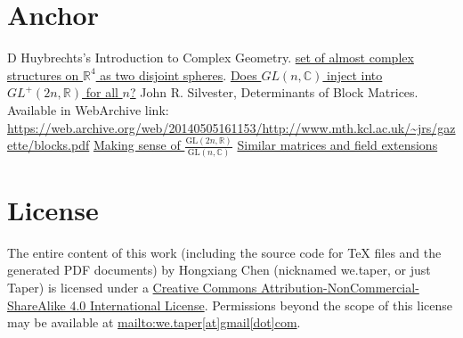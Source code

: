 \documentclass{article}
\numberwithin{equation}{subsection} %
\theoremstyle{definition}
\begin{document}
\section{Anchor}
\label{sec:Anchor}

\begin{thebibliography}{1}
   D Huybrechts's Introduction to Complex Geometry.
   \href{http://math.stackexchange.com/questions/923957/set-of-almost-complex-structures-on-mathbb-r4-as-two-disjoint-spheres}{set of almost complex structures on $\mathbb{R}^4$ as two disjoint spheres}.
   \href{http://math.stackexchange.com/questions/1356823/does-gln-mathbbc-inject-into-gl2n-mathbbr-for-all-n}{Does $GL(n,\mathbb{C})$ inject into $GL^+(2n, \mathbb{R})$ for all $n$?}
   John R. Silvester, 
      Determinants of Block Matrices. Available in WebArchive link:
      \url{https://web.archive.org/web/20140505161153/http://www.mth.kcl.ac.uk/~jrs/gazette/blocks.pdf}
   \href{http://math.stackexchange.com/questions/1927487/making-sense-of-frac-mathrmgl2n-mathbbr-mathrmgln-mathbbc/1927518?noredirect=1#comment3957369_1927518}{Making sense of $\frac{\mathrm{GL}(2n,\mathbb{R})}{\mathrm{GL}(n,\mathbb{C})}$}
   \href{http://math.stackexchange.com/questions/57242/similar-matrices-and-field-extensions?noredirect=1&lq=1}
  {Similar matrices and field extensions}
\end{thebibliography}
\printnomenclature


\section{License}
The entire content of this work (including the source code
for TeX files and the generated PDF documents) by 
Hongxiang Chen (nicknamed we.taper, or just Taper) is
licensed under a 
\href{http://creativecommons.org/licenses/by-nc-sa/4.0/}{Creative 
Commons Attribution-NonCommercial-ShareAlike 4.0 International 
License}. Permissions beyond the scope of this 
license may be available at \url{mailto:we.taper[at]gmail[dot]com}.
\end{document}
